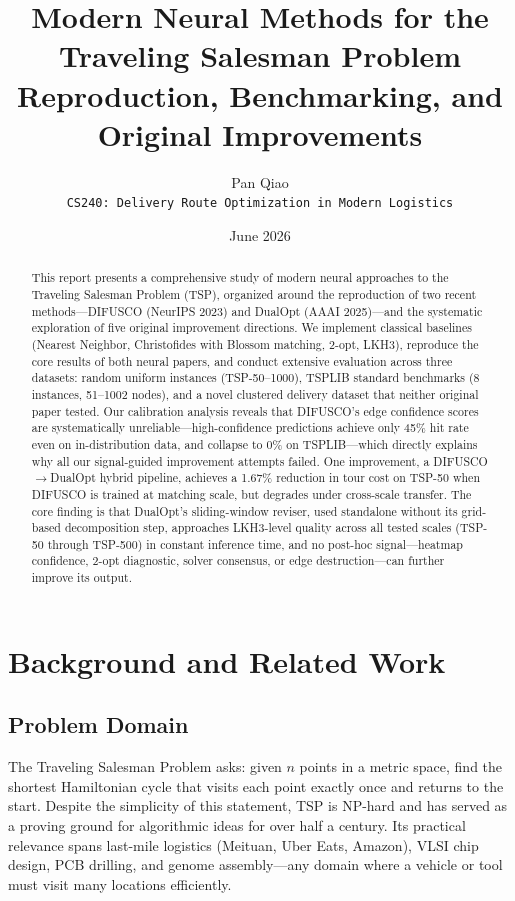 \documentclass[11pt,a4paper]{article}
\title{\vspace{-1.5cm}Modern Neural Methods for the Traveling Salesman Problem\\
\large Reproduction, Benchmarking, and Original Improvements}
\author{Pan Qiao\\
\texttt{CS240: Delivery Route Optimization in Modern Logistics}}
\date{June 2026}
\begin{document}
\maketitle

\begin{abstract}
This report presents a comprehensive study of modern neural approaches to the Traveling Salesman Problem (TSP), organized around the reproduction of two recent methods---DIFUSCO (NeurIPS 2023) and DualOpt (AAAI 2025)---and the systematic exploration of five original improvement directions. We implement classical baselines (Nearest Neighbor, Christofides with Blossom matching, 2-opt, LKH3), reproduce the core results of both neural papers, and conduct extensive evaluation across three datasets: random uniform instances (TSP-50--1000), TSPLIB standard benchmarks (8 instances, 51--1002 nodes), and a novel clustered delivery dataset that neither original paper tested. Our calibration analysis reveals that DIFUSCO's edge confidence scores are systematically unreliable---high-confidence predictions achieve only 45\% hit rate even on in-distribution data, and collapse to 0\% on TSPLIB---which directly explains why all our signal-guided improvement attempts failed. One improvement, a DIFUSCO$\rightarrow$DualOpt hybrid pipeline, achieves a 1.67\% reduction in tour cost on TSP-50 when DIFUSCO is trained at matching scale, but degrades under cross-scale transfer. The core finding is that DualOpt's sliding-window reviser, used standalone without its grid-based decomposition step, approaches LKH3-level quality across all tested scales (TSP-50 through TSP-500) in constant inference time, and no post-hoc signal---heatmap confidence, 2-opt diagnostic, solver consensus, or edge destruction---can further improve its output.
\end{abstract}

\section{Background and Related Work}

\subsection{Problem Domain}

The Traveling Salesman Problem asks: given $n$ points in a metric space, find the shortest Hamiltonian cycle that visits each point exactly once and returns to the start. Despite the simplicity of this statement, TSP is NP-hard and has served as a proving ground for algorithmic ideas for over half a century. Its practical relevance spans last-mile logistics (Meituan, Uber Eats, Amazon), VLSI chip design, PCB drilling, and genome assembly---any domain where a vehicle or tool must visit many locations efficiently.
\end{document}
